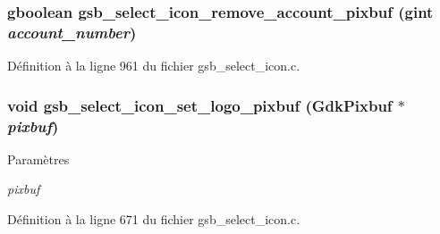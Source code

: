 \subsubsection[{gsb\_\-select\_\-icon\_\-remove\_\-account\_\-pixbuf}]{\setlength{\rightskip}{0pt plus 5cm}gboolean gsb\_\-select\_\-icon\_\-remove\_\-account\_\-pixbuf (gint {\em account\_\-number})}\label{gsb__select__icon_8h_a0582db6d9af709919cc700762ad20bf8}


Définition à la ligne 961 du fichier gsb\_\-select\_\-icon.c.

\subsubsection[{gsb\_\-select\_\-icon\_\-set\_\-logo\_\-pixbuf}]{\setlength{\rightskip}{0pt plus 5cm}void gsb\_\-select\_\-icon\_\-set\_\-logo\_\-pixbuf (GdkPixbuf $\ast$ {\em pixbuf})}\label{gsb__select__icon_8h_aea7e10723177974aa14adf95f95a7273}

\begin{DoxyParams}{Paramètres}
\item[{\em pixbuf}]\end{DoxyParams}


Définition à la ligne 671 du fichier gsb\_\-select\_\-icon.c.

